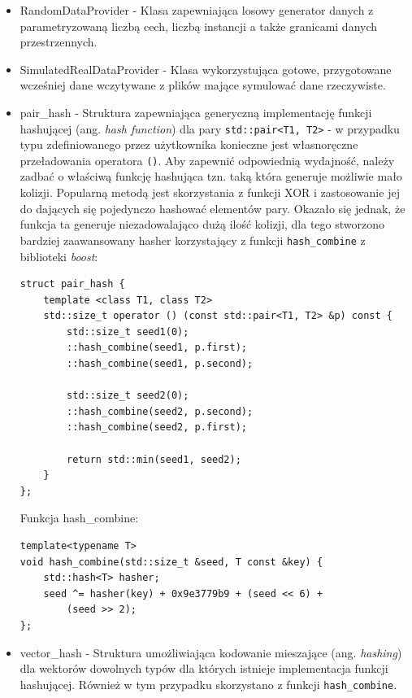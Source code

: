 \documentclass[12pt]{article}
\newcounter{operator}
\def\inline{\lstinline[basicstyle=\ttfamily,keywordstyle={}]}
\begin{document}
\begin{itemize}
\item RandomDataProvider - Klasa zapewniająca losowy generator danych z parametryzowaną liczbą cech, liczbą instancji a także granicami danych przestrzennych.

\item SimulatedRealDataProvider - Klasa wykorzystująca gotowe, przygotowane wcześniej dane wczytywane z plików mające symulować dane rzeczywiste.

\item pair\_hash - Struktura zapewniająca generyczną implementację funkcji hashującej (ang. 
\textit{hash function}) dla pary \inline{std::pair<T1, T2>} - w przypadku typu zdefiniowanego przez użytkownika konieczne jest własnoręczne przeładowania operatora \inline{()}. Aby zapewnić odpowiednią wydajność, należy zadbać o właściwą funkcję hashująca tzn. taką która generuje możliwie mało kolizji. Popularną metodą jest skorzystania z funkcji XOR i zastosowanie jej do dających się pojedynczo hashować elementów pary. Okazało się jednak, że funkcja ta generuje niezadowalająco dużą ilość kolizji, dla tego stworzono bardziej zaawansowany hasher korzystający z funkcji \inline{hash_combine} z biblioteki \textit{boost}:
\begin{minipage}{\linewidth}
\begin{lstlisting}[caption={Kod struktury pair\_hash}]
struct pair_hash {
	template <class T1, class T2>
	std::size_t operator () (const std::pair<T1, T2> &p) const {
		std::size_t seed1(0);
		::hash_combine(seed1, p.first);
		::hash_combine(seed1, p.second);

		std::size_t seed2(0);
		::hash_combine(seed2, p.second);
		::hash_combine(seed2, p.first);

		return std::min(seed1, seed2);
	}
};
\end{lstlisting}
\end{minipage}

Funkcja hash\_combine:
\begin{minipage}{\linewidth}
\begin{lstlisting}[caption={Kod funkcji hash\_combine}]
template<typename T>
void hash_combine(std::size_t &seed, T const &key) {
	std::hash<T> hasher;
	seed ^= hasher(key) + 0x9e3779b9 + (seed << 6) + 
    	(seed >> 2);
};
\end{lstlisting}
\end{minipage}

\item vector\_hash - Struktura umożliwiająca kodowanie mieszające (ang. \textit{hashing}) dla wektorów dowolnych typów dla których istnieje implementacja funkcji hashującej. Również w tym przypadku skorzystano z funkcji \inline{hash_combine}.


\end{itemize}
\end{document}
